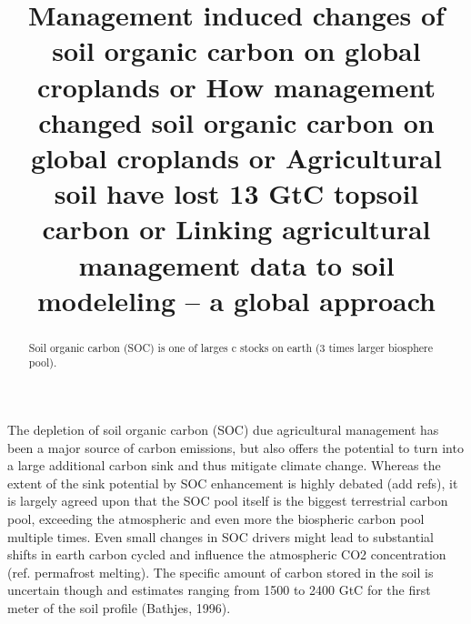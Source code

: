 \documentclass[gc, manuscript]{copernicus}
\begin{document}
\title{Management induced changes of soil organic carbon on global croplands \newline or \newline How management changed soil organic carbon on global croplands \newline or \newline Agricultural soil have lost 13 GtC topsoil carbon \newline or \newline Linking agricultural management data to soil modeleling -- a global approach}














\received{}
\pubdiscuss{} %
\revised{}
\accepted{}
\published{}




\maketitle


\begin{abstract}
Soil organic carbon (SOC) is one of larges c stocks on earth (3 times larger biosphere pool).
\end{abstract}




\newpage

\introduction

The depletion of soil organic carbon (SOC) due agricultural management has been a major source of carbon emissions, but also offers the potential to turn into a large additional carbon sink and thus mitigate climate change. Whereas the extent of the sink potential by SOC enhancement is highly debated (add refs), it is largely agreed upon that the SOC pool itself is the biggest terrestrial carbon pool, exceeding the atmospheric and even more the biospheric carbon pool multiple times. Even small changes in SOC drivers might lead to substantial shifts in earth carbon cycled and influence the atmospheric CO2 concentration (ref. permafrost melting). The specific amount of carbon stored in the soil is uncertain though and estimates ranging from 1500 to 2400 GtC for the first meter of the soil profile (Bathjes, 1996).
\end{document}
